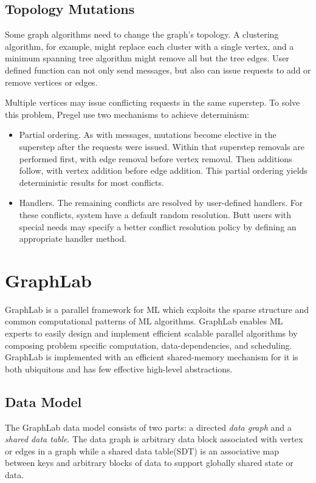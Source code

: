 \documentclass {report}
\begin{document}
\subsection{Topology Mutations}
Some graph algorithms need to change the graph's topology. A clustering algorithm, for example, might replace each
cluster with a single vertex, and a minimum spanning tree
algorithm might remove all but the tree edges. User defined function can not only send messages, but also can
issue requests to add or remove vertices or edges.


Multiple vertices may issue conflicting requests in the same
superstep. To solve this problem, Pregel use two mechanisms to achieve
determinism:
\begin{itemize}
  \item Partial ordering. As with messages, mutations become elective in the superstep after the requests were
  issued. Within that superstep removals are performed first, with edge removal before vertex removal. Then additions follow, with vertex addition before edge addition. This partial ordering yields deterministic results for most conflicts.
  \item Handlers. The remaining conflicts are resolved by user-defined handlers. For these conflicts, system have a default random resolution. Butt users with special needs may specify a better conflict resolution policy by defining an appropriate handler method.
\end{itemize}

\section{GraphLab}
GraphLab is a parallel framework for ML which exploits the sparse structure and common computational patterns of ML algorithms. GraphLab
enables ML experts to easily design and implement efficient scalable parallel algorithms by composing problem
specific computation, data-dependencies, and scheduling. GraphLab is implemented with an efficient shared-memory mechanism for it is both ubiquitous and has
few effective high-level abstractions.

\subsection{Data Model}
The GraphLab data model consists of two parts: a directed \emph{data graph} and a \emph{shared data table}. The data graph is arbitrary data block associated
with vertex or edges in a graph while a shared data table(SDT) is an associative map between keys and arbitrary blocks of data to support globally shared state or data.
\end{document}
